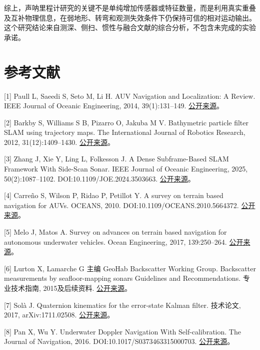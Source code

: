 综上，声呐里程计研究的关键不是单纯增加传感器或特征数量，而是利用真实重叠及互补物理信息，在弱地形、转弯和观测失效条件下仍保持可信的相对运动输出。这个研究结论来自测深、侧扫、惯性与融合文献的综合分析，不包含未完成的实验承诺。

\hypertarget{ux53c2ux8003ux6587ux732e}{%
\section{参考文献}\label{ux53c2ux8003ux6587ux732e}}

{[}1{]} Paull L, Saeedi S, Seto M, Li H. AUV Navigation and Localization: A Review. IEEE Journal of Oceanic Engineering, 2014, 39(1):131--149. \href{https://people.csail.mit.edu/lpaull/publications/Paull_JOE_2014.pdf}{公开来源}。

{[}2{]} Barkby S, Williams S B, Pizarro O, Jakuba M V. Bathymetric particle filter SLAM using trajectory maps. The International Journal of Robotics Research, 2012, 31(12):1409--1430. \href{https://doi.org/10.1177/0278364912459666}{公开来源}。

{[}3{]} Zhang J, Xie Y, Ling L, Folkesson J. A Dense Subframe-Based SLAM Framework With Side-Scan Sonar. IEEE Journal of Oceanic Engineering, 2025, 50(2):1087--1102. DOI:10.1109/JOE.2024.3503663. \href{https://arxiv.org/abs/2312.13802}{公开来源}。

{[}4{]} Carreño S, Wilson P, Ridao P, Petillot Y. A survey on terrain based navigation for AUVs. OCEANS, 2010. DOI:10.1109/OCEANS.2010.5664372. \href{https://eprints.soton.ac.uk/153897/1/Carreno_2010_-_A_survey__on_TBN_for_AUVs.pdf}{公开来源}。

{[}5{]} Melo J, Matos A. Survey on advances on terrain based navigation for autonomous underwater vehicles. Ocean Engineering, 2017, 139:250--264. \href{https://doi.org/10.1016/j.oceaneng.2017.04.047}{公开来源}。

{[}6{]} Lurton X, Lamarche G 主编 GeoHab Backscatter Working Group. Backscatter measurements by seafloor-mapping sonars Guidelines and Recommendations. 专业技术指南, 2015及后续资料. \href{https://geohab.org/backscatter-working-group/}{公开来源}。

{[}7{]} Solà J. Quaternion kinematics for the error-state Kalman filter. 技术论文, 2017, arXiv:1711.02508. \href{https://arxiv.org/abs/1711.02508}{公开来源}。

{[}8{]} Pan X, Wu Y. Underwater Doppler Navigation With Self-calibration. The Journal of Navigation, 2016. DOI:10.1017/S0373463315000703. \href{https://arxiv.org/abs/1509.02054}{公开来源}。

